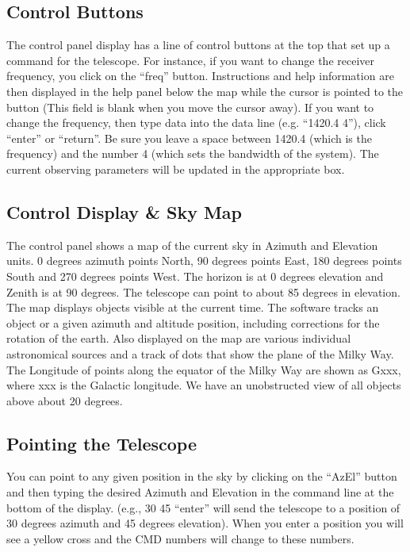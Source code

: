 \subsection{Control Buttons}
The control panel display has a line of control buttons at the top that set
up a command for the telescope. For instance, if you want to change the receiver
frequency, you click on the “freq” button. Instructions and help information are
then displayed in the help panel below the map while the cursor is pointed to the
button (This field is blank when you move the cursor away). If you want to
change the frequency, then type data into the data line (e.g. “1420.4 4”), click
“enter” or “return”. Be sure you leave a space between 1420.4 (which is the
frequency) and the number 4 (which sets the bandwidth of the system). The
current observing parameters will be updated in the appropriate box.

\subsection{Control Display \& Sky Map}
The control panel shows a map of the current sky in Azimuth and
Elevation units. 0 degrees azimuth points North, 90 degrees points East, 180
degrees points South and 270 degrees points West. The horizon is at 0 degrees
elevation and Zenith is at 90 degrees. The telescope can point to about 85
degrees in elevation.
The map displays objects visible at the current time. The software tracks
an object or a given azimuth and altitude position, including corrections for the
rotation of the earth. Also displayed on the map are various individual
astronomical sources and a track of dots that show the plane of the Milky Way.
The Longitude of points along the equator of the Milky Way are shown as Gxxx,
where xxx is the Galactic longitude. We have an unobstructed view of all objects
above about 20 degrees.

\subsection{Pointing the Telescope}
You can point to any given position in the sky by clicking on the “AzEl”
button and then typing the desired Azimuth and Elevation in the command line at
the bottom of the display. (e.g., 30 45 “enter” will send the telescope to a position
of 30 degrees azimuth and 45 degrees elevation). When you enter a position you
will see a yellow cross and the CMD numbers will change to these numbers. 

